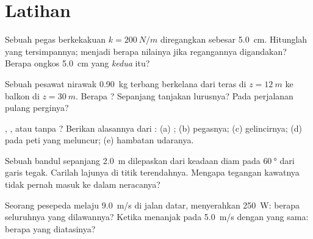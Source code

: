 \section{Latihan}

\begin{exercise}[$\star$]\label{exo:g12:work-and-energy:1}
Sebuah pegas berkekakuan $k = \qty{200}{N/m}$ diregangkan sebesar
\qty{5.0}{cm}. Hitunglah  yang tersimpannya; menjadi berapa nilainya jika
regangannya digandakan? Berapa ongkos \qty{5.0}{cm} yang \emph{kedua} itu?
\end{exercise}

\begin{exercise}[$\star$]\label{exo:g12:work-and-energy:2}
Sebuah pesawat nirawak \qty{0.90}{kg} terbang berkelana dari teras di
$z = \qty{12}{m}$ ke balkon di $z = \qty{30}{m}$. Berapa 
? Sepanjang tanjakan lurusnya? Pada perjalanan pulang perginya?
\end{exercise}

\begin{exercise}[$\star$]\label{exo:g12:work-and-energy:3}
, , atau tanpa ? Berikan alasannya dari :
(a) ; (b)  pegasnya; (c)  gelincirnya; (d)  pada peti yang meluncur; (e) hambatan udaranya.
\end{exercise}

\begin{exercise}[$\star$]\label{exo:g12:work-and-energy:4}
Sebuah bandul sepanjang \qty{2.0}{m} dilepaskan dari keadaan diam pada
$\qty{60}{\degree}$ dari garis tegak. Carilah lajunya di titik
terendahnya. Mengapa tegangan kawatnya tidak pernah masuk ke dalam neracanya?
\end{exercise}

\begin{exercise}[$\star$]\label{exo:g12:work-and-energy:5}
Seorang pesepeda melaju \qty{9.0}{m/s} di jalan datar, menyerahkan
\qty{250}{W}: berapa   seluruhnya yang dilawannya? Ketika menanjak pada
\qty{5.0}{m/s} dengan  yang sama:  berapa yang diatasinya?
\end{exercise}

